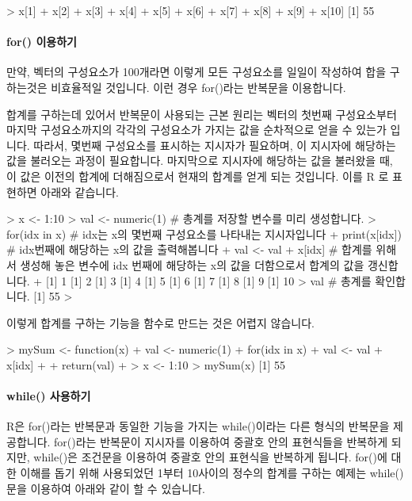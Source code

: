 \begin{Schunk}
\begin{Soutput}
> x[1] + x[2] + x[3] + x[4] + x[5] + x[6] + x[7] + x[8] + x[9] + x[10]
[1] 55
\end{Soutput}
\end{Schunk}

\paragraph{for() 이용하기}

만약, 벡터의 구성요소가 100개라면 이렇게 모든 구성요소를 일일이 작성하여 합을 구하는것은 비효율적일 것입니다. 
이런 경우 for()라는 반복문을 이용합니다. 

합계를 구하는데 있어서 반복문이 사용되는 근본 원리는 벡터의 첫번째 구성요소부터 마지막 구성요소까지의 각각의 구성요소가 가지는 값을 순차적으로 얻을 수 있는가 입니다.
따라서, 몇번째 구성요소를 표시하는 지시자가 필요하며, 이 지시자에 해당하는 값을 불러오는 과정이 필요합니다.
마지막으로 지시자에 해당하는 값을 불러왔을 때, 이 값은 이전의 합계에 더해짐으로서 현재의 합계를 얻게 되는 것입니다.
이를 R 로 표현하면 아래와 같습니다. 

\begin{Schunk}
\begin{Soutput}
> x <- 1:10
> val <- numeric(1)    # 총계를 저장할 변수를 미리 생성합니다.
> for(idx in x){       # idx는 x의 몇번째 구성요소를 나타내는 지시자입니다
+ print(x[idx])        # idx번째에 해당하는 x의 값을 출력해봅니다 
+ val <- val + x[idx]  # 합계를 위해서 생성해 놓은 변수에 idx 번째에 해당하는 x의 값을 더함으로서 합계의 값을 갱신합니다.
+ }
[1] 1
[1] 2
[1] 3
[1] 4
[1] 5
[1] 6
[1] 7
[1] 8
[1] 9
[1] 10
> val                   # 총계를 확인합니다. 
[1] 55
> 
\end{Soutput}
\end{Schunk}

이렇게 합계를 구하는 기능을 함수로 만드는 것은 어렵지 않습니다.

\begin{Schunk}
\begin{Soutput}
> mySum <- function(x){
+ val <- numeric(1)
+ for(idx in x){
+ val <- val + x[idx]
+ }
+ return(val)
+ }
> x <- 1:10
> mySum(x)
[1] 55
\end{Soutput}
\end{Schunk}

\paragraph{while() 사용하기}
R은 for()라는 반복문과 동일한 기능을 가지는 while()이라는 다른 형식의 반복문을 제공합니다.
for()라는 반복문이 지시자를 이용하여 중괄호 안의 표현식들을 반복하게 되지만, while()은 조건문을 이용하여 중괄호 안의 표현식을 반복하게 됩니다. 
for()에 대한 이해를 돕기 위해 사용되었던 1부터 10사이의 정수의 합계를 구하는 예제는 while()문을 이용하여 아래와 같이 할 수 있습니다.

